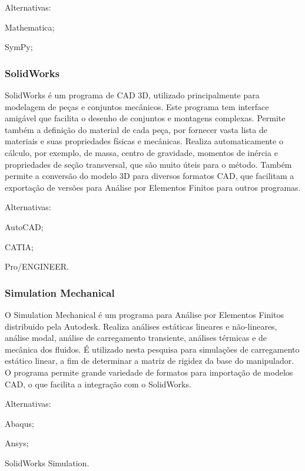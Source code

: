 Alternativas:
%
\begin{enumerate*}
	\item Mathematica;
	\item SymPy;
\end{enumerate*}

\subsubsection{SolidWorks}

SolidWorks\cite{solidworks} é um programa de CAD 3D, utilizado principalmente
para modelagem de peças e conjuntos mecânicos.
Este programa tem interface amigável que facilita o desenho de conjuntos e
montagens complexas. Permite também a definição do material de cada peça, por
fornecer vasta lista de materiais e suas propriedades físicas e mecânicas.
Realiza automaticamente o cálculo, por exemplo, de massa, centro de
gravidade, momentos de inércia e propriedades de seção transversal, que são
muito úteis para o método. Também permite a conversão do modelo 3D para diversos
formatos CAD, que facilitam a exportação de versões para Análise por Elementos
Finitos para outros programas.

Alternativas:
%
\begin{enumerate*}
	\item AutoCAD;
	\item CATIA;
	\item Pro/ENGINEER.
\end{enumerate*}

\subsubsection{Simulation Mechanical}

O Simulation Mechanical\cite{autodesk} é um programa para Análise por Elementos
Finitos distribuido pela Autodesk.  Realiza análises estáticas lineares e não-lineares,
análise modal, análise de carregamento transiente, análises térmicas e de
mecânica dos fluidos.
É utilizado nesta pesquisa para simulações de carregamento estático linear, a
fim de determinar a matriz de rigidez da base do manipulador. O programa permite
grande variedade de formatos para importação de modelos CAD, o que facilita a
integração com o SolidWorks.

Alternativas:
%
\begin{enumerate*}
	\item Abaqus;
	\item Ansys;
	\item SolidWorks Simulation.
\end{enumerate*}


